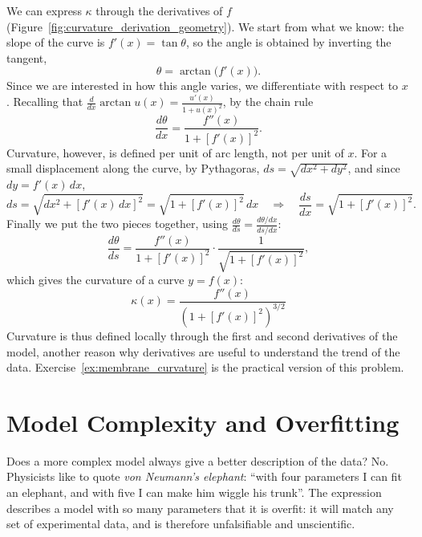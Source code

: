 \documentclass[letterpaper,11pt,leqno]{book}
\begin{document}
We can express $\kappa$ through the derivatives of $f$ (Figure~\ref{fig:curvature_derivation_geometry}). We start from what we know: the slope of the curve is $f'(x) = \tan\theta$, so the angle is obtained by inverting the tangent,
\begin{equation}
\theta = \arctan\big(f'(x)\big).
\label{eq:theta_arctan}
\end{equation}
Since we are interested in how this angle varies, we differentiate with respect to $x$. Recalling that $\frac{d}{dx}\arctan u(x) = \frac{u'(x)}{1 + u(x)^2}$, by the chain rule
\begin{equation}
\frac{d\theta}{dx} = \frac{f''(x)}{1 + [f'(x)]^2}.
\label{eq:dtheta_dx}
\end{equation}
Curvature, however, is defined per unit of arc length, not per unit of $x$. For a small displacement along the curve, by Pythagoras, $ds = \sqrt{dx^2 + dy^2}$, and since $dy = f'(x)\,dx$,
\begin{equation}
ds = \sqrt{dx^2 + [f'(x)\,dx]^2} = \sqrt{1 + [f'(x)]^2}\,dx \quad \Longrightarrow \quad \frac{ds}{dx} = \sqrt{1 + [f'(x)]^2}.
\label{eq:ds_dx}
\end{equation}
Finally we put the two pieces together, using $\frac{d\theta}{ds} = \frac{d\theta/dx}{ds/dx}$:
\begin{equation}
\frac{d\theta}{ds} = \frac{f''(x)}{1 + [f'(x)]^2}\cdot\frac{1}{\sqrt{1 + [f'(x)]^2}},
\end{equation}
which gives the curvature of a curve $y = f(x)$:
\begin{equation}
\boxed{\kappa(x) = \frac{f''(x)}{\left(1 + [f'(x)]^2\right)^{3/2}}}
\label{eq:curvature_final_formula}
\end{equation}
Curvature is thus defined locally through the first and second derivatives of the model, another reason why derivatives are useful to understand the trend of the data. Exercise~\ref{ex:membrane_curvature} is the practical version of this problem.

\section{Model Complexity and Overfitting}
\label{sec:overfitting}

Does a more complex model always give a better description of the data? No. Physicists like to quote \emph{von Neumann's elephant}: ``with four parameters I can fit an elephant, and with five I can make him wiggle his trunk''. The expression describes a model with so many parameters that it is overfit: it will match any set of experimental data, and is therefore unfalsifiable and unscientific.
\end{document}
